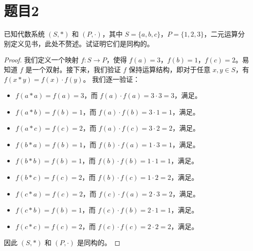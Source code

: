 \documentclass[utf8]{ctexart}
\theoremstyle{mystyle}
\begin{document}
\section*{题目2}
\begin{problembox}
  已知代数系统 $(S, *)$ 和 $(P, \cdot)$，其中 $S = \{a, b, c\}$，$P = \{1, 2, 3\}$，二元运算分别定义见书，此处不赘述。试证明它们是同构的。
\end{problembox}
\begin{proof}
我们定义一个映射 $f: S \to P$，使得 $f(a) = 3$，$f(b) = 1$，$f(c) = 2$。易知道 $f$ 是一个双射。接下来，我们验证 $f$ 保持运算结构，即对于任意 $x, y \in S$，有 $f(x * y) = f(x) \cdot f(y)$。
我们逐一验证：
\begin{itemize}
  \item $f(a * a) = f(a) = 3$，而 $f(a) \cdot f(a) = 3 \cdot 3 = 3$，满足。
  
  \item $f(a * b) = f(b) = 1$，而 $f(a) \cdot f(b) = 3 \cdot 1 = 1$，满足。
  
  \item $f(a * c) = f(c) = 2$，而 $f(a) \cdot f(c) = 3 \cdot 2 = 2$，满足。
  
  \item $f(b * a) = f(b) = 1$，而 $f(b) \cdot f(a) = 1 \cdot 3 = 1$，满足。
  
  \item $f(b * b) = f(b) = 1$，而 $f(b) \cdot f(b) = 1 \cdot 1 = 1$，满足。
  
  \item $f(b * c) = f(c) = 2$，而 $f(b) \cdot f(c) = 1 \cdot 2 = 2$，满足。
  
  \item $f(c * a) = f(c) = 2$，而 $f(c) \cdot f(a) = 2 \cdot 3 = 2$，满足。
  
  \item $f(c * b) = f(b) = 1$，而 $f(c) \cdot f(b) = 2 \cdot 1 = 1$，满足。
  
  \item $f(c * c) = f(c) = 2$，而 $f(c) \cdot f(c) = 2 \cdot 2 = 2$，满足。
\end{itemize}
因此 $(S, *)$ 和 $(P, \cdot)$ 是同构的。
\end{proof}

\newpage
\end{document}
